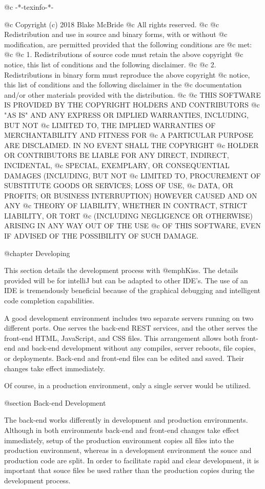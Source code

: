 @c -*-texinfo-*-

@c  Copyright (c) 2018 Blake McBride
@c  All rights reserved.
@c
@c  Redistribution and use in source and binary forms, with or without
@c  modification, are permitted provided that the following conditions are
@c  met:
@c
@c  1. Redistributions of source code must retain the above copyright
@c  notice, this list of conditions and the following disclaimer.
@c
@c  2. Redistributions in binary form must reproduce the above copyright
@c  notice, this list of conditions and the following disclaimer in the
@c  documentation and/or other materials provided with the distribution.
@c
@c  THIS SOFTWARE IS PROVIDED BY THE COPYRIGHT HOLDERS AND CONTRIBUTORS
@c  "AS IS" AND ANY EXPRESS OR IMPLIED WARRANTIES, INCLUDING, BUT NOT
@c  LIMITED TO, THE IMPLIED WARRANTIES OF MERCHANTABILITY AND FITNESS FOR
@c  A PARTICULAR PURPOSE ARE DISCLAIMED. IN NO EVENT SHALL THE COPYRIGHT
@c  HOLDER OR CONTRIBUTORS BE LIABLE FOR ANY DIRECT, INDIRECT, INCIDENTAL,
@c  SPECIAL, EXEMPLARY, OR CONSEQUENTIAL DAMAGES (INCLUDING, BUT NOT
@c  LIMITED TO, PROCUREMENT OF SUBSTITUTE GOODS OR SERVICES; LOSS OF USE,
@c  DATA, OR PROFITS; OR BUSINESS INTERRUPTION) HOWEVER CAUSED AND ON ANY
@c  THEORY OF LIABILITY, WHETHER IN CONTRACT, STRICT LIABILITY, OR TORT
@c  (INCLUDING NEGLIGENCE OR OTHERWISE) ARISING IN ANY WAY OUT OF THE USE
@c  OF THIS SOFTWARE, EVEN IF ADVISED OF THE POSSIBILITY OF SUCH DAMAGE.


@chapter Developing

This section details the development process with @emph{Kiss}.  The
details provided will be for intelliJ but can be adapted to other
IDE's.  The use of an IDE is tremendously beneficial because of the
graphical debugging and intelligent code completion capabilities.

A good development environment includes two separate servers running
on two different ports.  One serves the back-end REST services, and
the other serves the front-end HTML, JavaScript, and CSS files.  This
arrangement allows both front-end and back-end development without any
compiles, server reboots, file copies, or deployments.  Back-end and
front-end files can be edited and saved.  Their changes take effect
immediately.

Of course, in a production environment, only a single server would be
utilized.

@section Back-end Development

The back-end works differently in development and production
environments.  Although in both environments back-end and front-end
changes take effect immediately, setup of the production environment
copies all files into the production environment, whereas in a
development environment the souce and production code are split.  In
order to facilitate rapid and clear development, it is important that
souce files be used rather than the production copies during the
development process.

